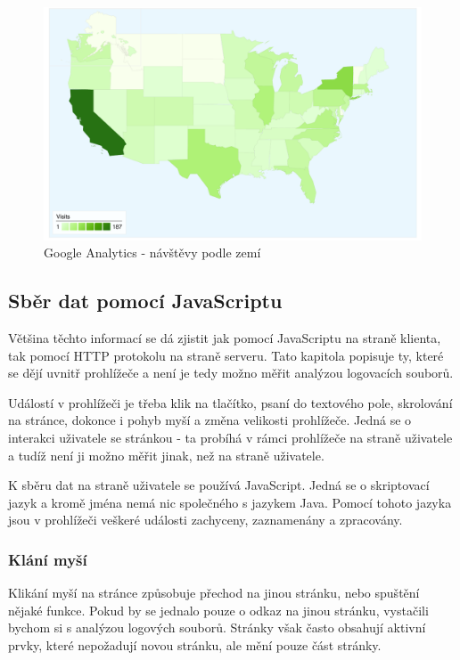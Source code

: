 \documentclass[bc,male,java,dept456]{diploma}						%
\begin{document}
\begin{figure}[hp]
	\centering
	\includegraphics[width=14.25cm]{img/map-analytics.pdf}
	\caption{Google Analytics - návštěvy podle zemí}
	\label{img:analytics-map}
\end{figure}



\subsection{Sběr dat pomocí JavaScriptu}

Většina těchto informací se dá zjistit jak pomocí JavaScriptu na straně klienta, tak pomocí HTTP protokolu na straně serveru. Tato kapitola popisuje ty, které se dějí uvnitř prohlížeče a není je tedy možno měřit analýzou logovacích souborů.

Událostí v prohlížeči je třeba klik na tlačítko, psaní do textového pole, skrolování na stránce, dokonce i pohyb myší a změna velikosti prohlížeče. Jedná se o interakci uživatele se stránkou - ta probíhá v rámci prohlížeče na straně uživatele a tudíž není ji možno měřit jinak, než na straně uživatele.

K sběru dat na straně uživatele se používá JavaScript. Jedná se o skriptovací jazyk a kromě jména nemá nic společného s jazykem Java. Pomocí tohoto jazyka jsou v prohlížeči veškeré události zachyceny, zaznamenány a zpracovány.

\subsubsection{Klání myší}

Klikání myší na stránce způsobuje přechod na jinou stránku, nebo spuštění nějaké funkce. Pokud by se jednalo pouze o odkaz na jinou stránku, vystačili bychom si s analýzou logových souborů. Stránky však často obsahují aktivní prvky, které nepožadují novou stránku, ale mění pouze část stránky. 
\end{document}

